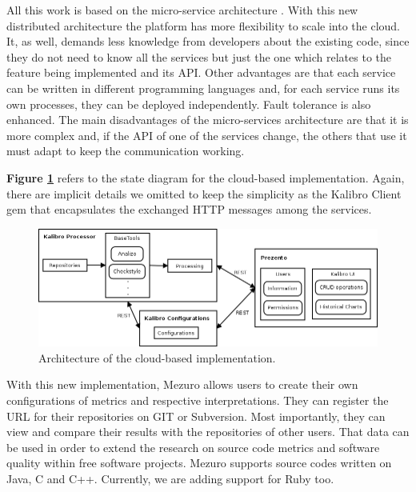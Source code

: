 All this work is based on the micro-service architecture \cite{namiot2014micro}. With this new distributed architecture the platform has more flexibility to scale into the cloud. It, as well, demands less knowledge from developers about the existing code, since they do not need to know all the services but just the one which relates to the feature being implemented and its API. Other advantages are that each service can be written in different programming languages and, for each service runs its own processes, they can be deployed independently. Fault tolerance is also enhanced. The main disadvantages of the micro-services architecture are that it is more complex and, if the API of one of the services change, the others that use it must adapt to keep the communication working.

\textbf{Figure \ref{fig:mezuro-cloud-arch}} refers to the state diagram for the cloud-based implementation. Again, there are implicit details we omitted to keep the simplicity as the Kalibro Client gem that encapsulates the exchanged HTTP messages among the services.

\begin{figure}[htb]
  \centering
  \includegraphics[width=\textwidth]{images/mezuro-cloud-arch.png}
  \caption{Architecture of the cloud-based implementation.}
  \label{fig:mezuro-cloud-arch}
\end{figure}

With this new implementation, Mezuro allows users to create their own configurations of metrics and respective interpretations. They can register the URL for their repositories on GIT or Subversion. Most importantly, they can view and compare their results with the repositories of other users. That data can be used in order to extend the research on source code metrics and software quality within free software projects. Mezuro supports source codes written on Java, C and C++. Currently, we are adding support for Ruby too.